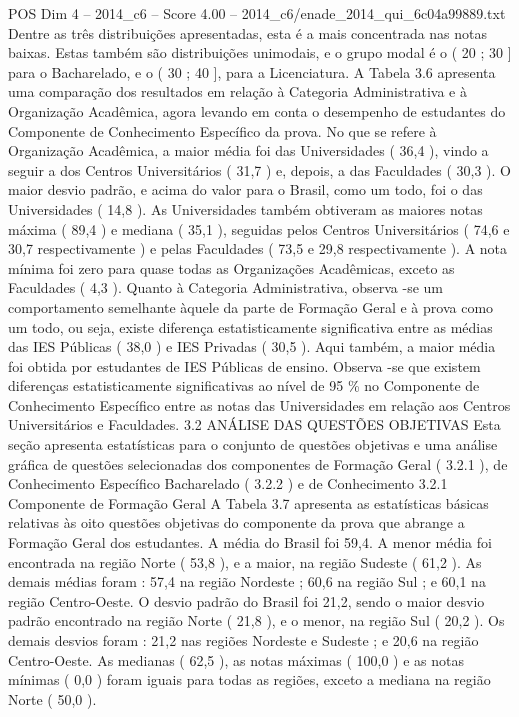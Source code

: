 \begin{textsample}{POS Dim 4 – 2014\_c6 – Score 4.00 – 2014\_c6/enade\_2014\_qui\_6c04a99889.txt}
Dentre as três distribuições apresentadas, esta é a mais concentrada nas notas baixas.
Estas também são distribuições unimodais, e o grupo modal é o ( 20 ; 30 ] para o Bacharelado, e o ( 30 ; 40 ], para a Licenciatura.
A Tabela 3.6 apresenta uma comparação dos resultados em relação à Categoria Administrativa e à Organização Acadêmica, agora levando em conta o desempenho de estudantes do Componente de Conhecimento Específico da prova.
No que se refere à Organização Acadêmica, a maior média foi das Universidades ( 36,4 ), vindo a seguir a dos Centros Universitários ( 31,7 ) e, depois, a das Faculdades ( 30,3 ).
O maior desvio padrão, e acima do valor para o Brasil, como um todo, foi o das Universidades ( 14,8 ).
As Universidades também obtiveram as maiores notas máxima ( 89,4 ) e mediana ( 35,1 ), seguidas pelos Centros Universitários ( 74,6 e 30,7 respectivamente ) e pelas Faculdades ( 73,5 e 29,8 respectivamente ).
A nota mínima foi zero para quase todas as Organizações Acadêmicas, exceto as Faculdades ( 4,3 ).
Quanto à Categoria Administrativa, observa -se um comportamento semelhante àquele da parte de Formação Geral e à prova como um todo, ou seja, existe diferença estatisticamente significativa entre as médias das IES Públicas ( 38,0 ) e IES Privadas ( 30,5 ).
Aqui também, a maior média foi obtida por estudantes de IES Públicas de ensino.
Observa -se que existem diferenças estatisticamente significativas ao nível de 95 \% no Componente de Conhecimento Específico entre as notas das Universidades em relação aos Centros Universitários e Faculdades. 3.2 ANÁLISE DAS QUESTÕES OBJETIVAS Esta seção apresenta estatísticas para o conjunto de questões objetivas e uma análise gráfica de questões selecionadas dos componentes de Formação Geral ( 3.2.1 ), de Conhecimento Específico Bacharelado ( 3.2.2 ) e de Conhecimento 3.2.1 Componente de Formação Geral A Tabela 3.7 apresenta as estatísticas básicas relativas às oito questões objetivas do componente da prova que abrange a Formação Geral dos estudantes.
A média do Brasil foi 59,4.
A menor média foi encontrada na região Norte ( 53,8 ), e a maior, na região Sudeste ( 61,2 ).
As demais médias foram : 57,4 na região Nordeste ; 60,6 na região Sul ; e 60,1 na região Centro-Oeste.
O desvio padrão do Brasil foi 21,2, sendo o maior desvio padrão encontrado na região Norte ( 21,8 ), e o menor, na região Sul ( 20,2 ).
Os demais desvios foram : 21,2 nas regiões Nordeste e Sudeste ; e 20,6 na região Centro-Oeste.
As medianas ( 62,5 ), as notas máximas ( 100,0 ) e as notas mínimas ( 0,0 ) foram iguais para todas as regiões, exceto a mediana na região Norte ( 50,0 ).

\end{textsample}
